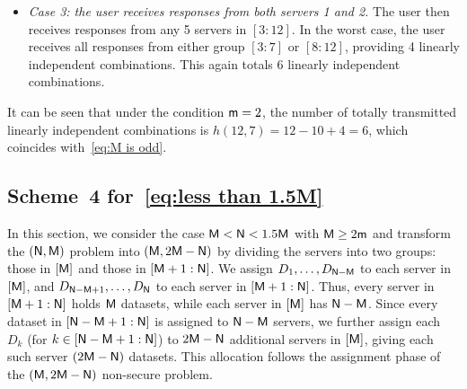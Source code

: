 \documentclass[conference,letterpaper]{IEEEtran}
\begin{document}
\begin{example}
\begin{itemize}
\item {\it Case 3: the user receives responses from both servers 1 and 2.} The user then receives responses from any 5 servers in $[3:12]$. In the worst case, the user receives all responses from either group $[3:7]$ or $[8:12]$, providing 4 linearly independent combinations. This again totals 6 linearly independent combinations.
\end{itemize}
It can be seen that under the condition ${\sf m} = 2$, the number of totally transmitted linearly independent combinations is $h(12,7) = 12 - 10 + 4 = 6$, which coincides with~\eqref{eq:M is odd}.


\fi

\end{example}

\subsection{\texorpdfstring{Scheme~4 for~\eqref{eq:less than 1.5M}}{Scheme 4 for Eq. (Z)}}
\label{sub:less than 1.5M}
In this section, we consider the case \( {\sf M} < {\sf N} < 1.5 {\sf M} \) with \( {\sf M} \ge 2 {\sf m} \) and transform the \(({\sf N},{\sf M})\) problem into \(({\sf M}, 2{\sf M} - {\sf N})\) by dividing the servers into two groups: those in \([{\sf M}]\) and those in \([{\sf M}+1 : {\sf N}]\).
We assign \(D_1, \ldots, D_{{\sf N} - {\sf M}}\) to each server in \([{\sf M}]\), and \(D_{{\sf N} - {\sf M} + 1}, \ldots, D_{{\sf N}}\) to each server in \([{\sf M}+1 : {\sf N}]\). Thus, every server in \([{\sf M}+1 : {\sf N}]\) holds \({\sf M}\) datasets, while each server in \([{\sf M}]\) has \({\sf N} - {\sf M}\). Since every dataset in \([{\sf N} - {\sf M} + 1 : {\sf N}]\) is assigned to \({\sf N} - {\sf M}\) servers, we further assign each \(D_k\) (for \(k \in [{\sf N} - {\sf M} + 1 : {\sf N}]\)) to \(2{\sf M} - {\sf N}\) additional servers in \([{\sf M}]\), giving each such server \((2{\sf M} - {\sf N})\) datasets. This allocation follows the assignment phase of the \(({\sf M}, 2{\sf M} - {\sf N})\) non-secure problem.

\end{document}
